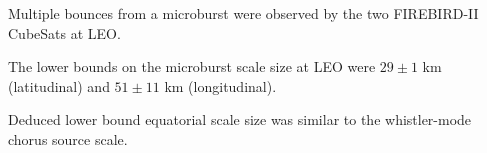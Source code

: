 \documentclass[draft, linenumbers]{agujournal}
\begin{document}






\begin{keypoints}
\item Multiple bounces from a microburst were observed by the two FIREBIRD-II CubeSats at LEO.
\item The lower bounds on the microburst scale size at LEO were $29 \pm 1$ km (latitudinal) and $51 \pm 11$ km (longitudinal).
\item Deduced lower bound equatorial scale size was similar to the whistler-mode chorus source scale.
\end{keypoints}

%
%

\end{document}
